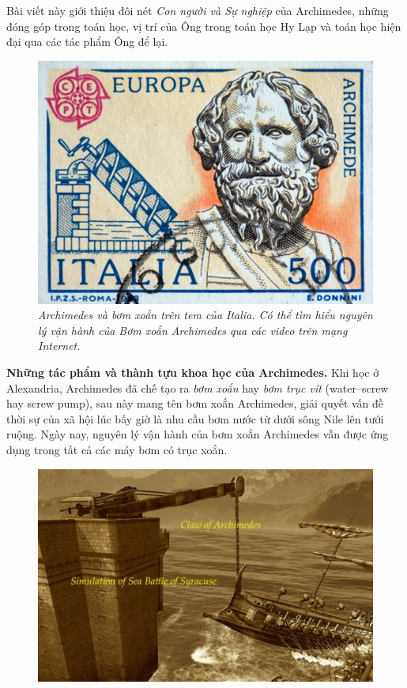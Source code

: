 \begin{multicols}{2}
	\vskip 0.1cm
	Bài viết này giới thiệu đôi nét \textit{Con người và Sự nghiệp} của Archimedes, những đóng góp trong toán học, vị trí của Ông trong toán học Hy Lạp và toán học hiện đại qua các tác phẩm Ông để lại. 
	\begin{figure}[H]
		\vspace*{-5pt}
		\centering
		\captionsetup{labelformat= empty, justification=centering}
		\includegraphics[width= 1\linewidth]{2}
		\caption{\small\textit{\color{lichsutoanhoc}Archimedes và bơm xoắn trên tem của Italia. Có thể tìm hiểu nguyên lý vận hành của Bơm xoắn Archimedes qua các video trên mạng Internet.}}
		\vspace*{-10pt}
	\end{figure}
	\textbf{\color{lichsutoanhoc}Những tác phẩm và thành tựu khoa học của Archimedes.} Khi học ở Alexandria, Archimedes đã chế tạo ra \textit{bơm xoắn} hay \textit{bơm trục vít} (water--screw hay screw pump), sau này mang tên bơm xoắn Archimedes, giải quyết vấn đề thời sự của xã hội lúc bấy giờ là nhu cầu bơm nước từ dưới sông Nile lên tưới ruộng. Ngày nay, nguyên lý vận hành của bơm xoắn Archimedes vẫn được ứng dụng trong tất cả các máy bơm có trục xoắn. 
	\begin{figure}[H]
		\vspace*{-5pt}
		\centering
		\captionsetup{labelformat= empty, justification=centering}
		\includegraphics[width= 1\linewidth]{3}

\end{figure}
\end{multicols}
